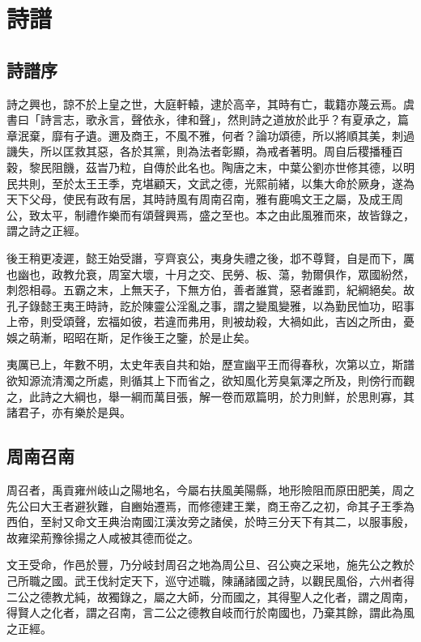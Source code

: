 \chapter{詩譜}

\section*{詩譜序}

詩之興也，諒不於上皇之世，大庭軒轅，逮於高辛，其時有亡，載籍亦蔑云焉。虞書曰「詩言志，歌永言，聲依永，律和聲」，然則詩之道放於此乎？有夏承之，篇章泯棄，靡有孑遺。邇及商王，不風不雅，何者？論功頌德，所以將順其美，刺過譏失，所以匡救其惡，各於其黨，則為法者彰顯，為戒者著明。周自后稷播種百穀，黎民阻饑，茲旹乃粒，自傳於此名也。陶唐之末，中葉公劉亦世修其德，以明民共則，至於太王王季，克堪顧天，文武之德，光熙前緒，以集大命於厥身，遂為天下父母，使民有政有居，其時詩風有周南召南，雅有鹿鳴文王之屬，及成王周公，致太平，制禮作樂而有頌聲興焉，盛之至也。本之由此風雅而來，故皆錄之，謂之詩之正經。

後王稍更凌遲，懿王始受譖，亨齊哀公，夷身失禮之後，邶不尊賢，自是而下，厲也幽也，政教允衰，周室大壞，十月之交、民勞、板、蕩，勃爾俱作，眾國紛然，刺怨相尋。五霸之末，上無天子，下無方伯，善者誰賞，惡者誰罰，紀綱絕矣。故孔子錄懿王夷王時詩，訖於陳靈公淫亂之事，謂之變風變雅，以為勤民恤功，昭事上帝，則受頌聲，宏福如彼，若違而弗用，則被劫殺，大禍如此，吉凶之所由，憂娛之萌漸，昭昭在斯，足作後王之鑒，於是止矣。

夷厲已上，年數不明，太史年表自共和始，歷宣幽平王而得春秋，次第以立，斯譜欲知源流清濁之所處，則循其上下而省之，欲知風化芳臭氣澤之所及，則傍行而觀之，此詩之大綱也，舉一綱而萬目張，解一卷而眾篇明，於力則鮮，於思則寡，其諸君子，亦有樂於是與。

\section*{周南召南}

周召者，禹貢雍州岐山之陽地名，今屬右扶風美陽縣，地形險阻而原田肥美，周之先公曰大王者避狄難，自豳始遷焉，而修德建王業，商王帝乙之初，命其子王季為西伯，至紂又命文王典治南國江漢汝旁之諸侯，於時三分天下有其二，以服事殷，故雍梁荊豫徐揚之人咸被其德而從之。

文王受命，作邑於豐，乃分岐封周召之地為周公旦、召公奭之采地，施先公之教於己所職之國。武王伐紂定天下，巡守述職，陳誦諸國之詩，以觀民風俗，六州者得二公之德教尤純，故獨錄之，屬之大師，分而國之，其得聖人之化者，謂之周南，得賢人之化者，謂之召南，言二公之德教自岐而行於南國也，乃棄其餘，謂此為風之正經。

